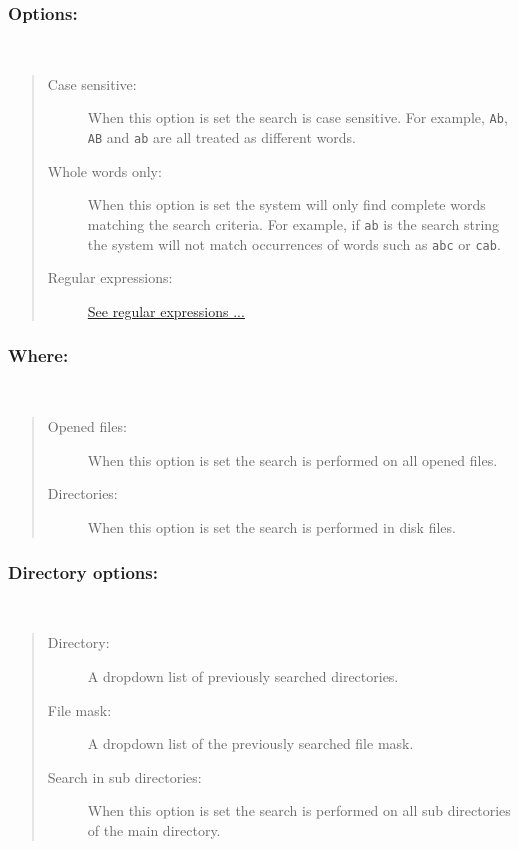 \subsubsection{Options:}\\
\begin{quote}
  \begin{footnotesize}
    \begin{description}
      \item[Case sensitive:]
        When this option is set the search is case sensitive.
        For example, \texttt{Ab}, \texttt{AB} and \texttt{ab}
        are all treated as different words.
      \item[Whole words only:]
        When this option is set the system will only find complete
        words matching the search criteria. For example, if
        \texttt{ab} is the search string the system will not match
        occurrences of words such as \texttt{abc} or \texttt{cab}.
      \item[Regular expressions:]
        \href{\#working\_regularexpressions}{See regular expressions ...}
    \end{description}
  \end{footnotesize}
\end{quote}

\subsubsection{Where:}\\
\begin{quote}
  \begin{footnotesize}
    \begin{description}
      \item[Opened files:]
        When this option is set the search is performed on all opened files.
      \item[Directories:]
        When this option is set the search is performed in disk files.
    \end{description}
  \end{footnotesize}
\end{quote}

\subsubsection{Directory options:}\\
\begin{quote}
  \begin{footnotesize}
    \begin{description}
      \item[Directory:]
        A dropdown list of previously searched directories.
      \item[File mask:]
        A dropdown list of the previously searched file mask.
      \item[Search in sub directories:]
        When this option is set the search is performed on all sub
        directories of the main directory.
    \end{description}
  \end{footnotesize}
\end{quote}

